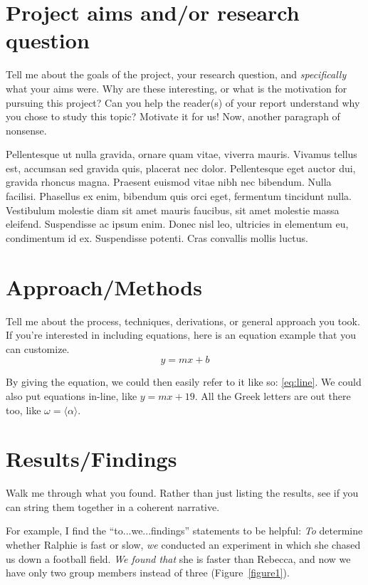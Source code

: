 \documentclass[10pt,twocolumn,superscriptaddress,notitlepage]{revtex4-1}
\begin{document}
\section{Project aims and/or research question}

Tell me about the goals of the project, your research question, and {\it specifically} what your aims were. Why are these interesting, or what is the motivation for pursuing this project? Can you help the reader(s) of your report understand why you chose to study this topic? Motivate it for us!  Now, another paragraph of nonsense.

Pellentesque ut nulla gravida, ornare quam vitae, viverra mauris. Vivamus tellus est, accumsan sed gravida quis, placerat nec dolor. Pellentesque eget auctor dui, gravida rhoncus magna. Praesent euismod vitae nibh nec bibendum. Nulla facilisi. Phasellus ex enim, bibendum quis orci eget, fermentum tincidunt nulla. Vestibulum molestie diam sit amet mauris faucibus, sit amet molestie massa eleifend. Suspendisse ac ipsum enim. Donec nisl leo, ultricies in elementum eu, condimentum id ex. Suspendisse potenti. Cras convallis mollis luctus.


\section{Approach/Methods}

Tell me about the process, techniques, derivations, or general approach you took. If you're interested in including equations, here is an equation example that you can customize. 
\begin{equation}
	y = mx+b
	\label{eq:line}
\end{equation}

By giving the equation, we could then easily refer to it like so: \eqref{eq:line}.  We could also put equations in-line, like $y=mx+19$. All the Greek letters are out there too, like $\omega = \langle \alpha \rangle$.


\section{Results/Findings}

Walk me through what you found. Rather than just listing the results, see if you can string them together in a coherent narrative. 

For example, I find the ``to...we...findings'' statements to be helpful: {\it To} determine whether Ralphie is fast or slow, {\it we} conducted an experiment in which she chased us down a football field. {\it We found that} she is faster than Rebecca, and now we have only two group members instead of three (Figure~\ref{figure1}). 
\end{document}
